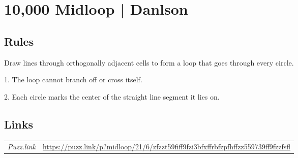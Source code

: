 \section[10,000 Midloop | Danlson {[\emph{Midloop}]}]{10,000 Midloop | {\normalfont Danlson}}
\label{sec:37-10000-midloop-danlson}

\subsection*{Rules}
\begin{markdown}
Draw lines through orthogonally adjacent cells to form a loop that goes through every circle.

1. The loop cannot branch off or cross itself.

2. Each circle marks the center of the straight line segment it lies on.
\end{markdown}
\subsection*{Links}
\begin{tabularx}{\textwidth}{l X}
\emph{Puzz.link} & \url{https://puzz.link/p?midloop/21/6/zfzzt59fiff9fzi3bfxffrbfzpfhffzz559739ff9fzzfsfl} \\
\end{tabularx}
\pagebreak
